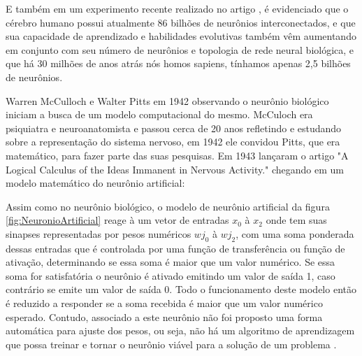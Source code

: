 E também em um experimento recente realizado no artigo \cite{Fapesp192}, é evidenciado que o cérebro humano possui atualmente 86 bilhões de neurônios interconectados, e que sua capacidade de aprendizado e habilidades evolutivas também vêm aumentando em conjunto com seu número de neurônios e topologia de rede neural biológica, e que há 30 milhões de anos atrás nós homos sapiens, tínhamos apenas 2,5 bilhões de neurônios.

Warren McCulloch e Walter Pitts em 1942 observando o neurônio biológico iniciam a busca de um modelo computacional do mesmo. McCuloch era psiquiatra e neuroanatomista e passou cerca de 20 anos refletindo e estudando sobre a representação do sistema nervoso, em 1942 ele convidou Pitts, que era matemático, para fazer parte das suas pesquisas. Em 1943 lançaram o artigo "A Logical Calculus of the Ideas Immanent in Nervous Activity." chegando em um modelo matemático do neurônio artificial: 

            \begin{figure}[H]
            \end{figure}

Assim como no neurônio biológico, o modelo de neurônio artificial da figura \ref{fig:NeuronioArtificial} reage à um vetor de entradas $x_0$ à $x_2$ onde tem suas sinapses representadas por pesos numéricos $wj_0$ à $wj_2$, com uma soma ponderada dessas entradas que é controlada por uma função de transferência ou função de ativação, determinando se essa soma é maior que um valor numérico. Se essa soma for satisfatória o neurônio é ativado emitindo um valor de saída 1, caso contrário se emite um valor de saída 0.
Todo o funcionamento deste modelo então é reduzido a responder se a soma recebida é maior que um valor numérico esperado. Contudo, associado a este neurônio não foi proposto uma forma automática para ajuste dos pesos, ou seja, não há um algoritmo de aprendizagem que possa treinar e tornar o neurônio viável para a solução de um problema \cite{Haykin1994}.
        
